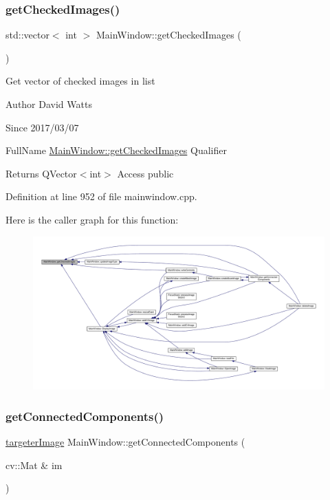 \subsubsection{\texorpdfstring{get\+Checked\+Images()}{getCheckedImages()}}
{\footnotesize\ttfamily std\+::vector$<$ int $>$ Main\+Window\+::get\+Checked\+Images (\begin{DoxyParamCaption}{ }\end{DoxyParamCaption})}

Get vector of checked images in list

\begin{DoxyAuthor}{Author}
David Watts 
\end{DoxyAuthor}
\begin{DoxySince}{Since}
2017/03/07
\end{DoxySince}
Full\+Name \hyperlink{class_main_window_a1e798fdae21c3294495ea7994df1887a}{Main\+Window\+::get\+Checked\+Images} Qualifier \begin{DoxyReturn}{Returns}
Q\+Vector$<$int$>$ Access public 
\end{DoxyReturn}


Definition at line 952 of file mainwindow.\+cpp.

Here is the caller graph for this function\+:
\nopagebreak
\begin{figure}[H]
\begin{center}
\leavevmode
\includegraphics[width=350pt]{class_main_window_a1e798fdae21c3294495ea7994df1887a_icgraph}
\end{center}
\end{figure}
\mbox{\label{class_main_window_a49cfabc6ef4845c5a9b5c9a92c9d4e2e}} 
\subsubsection{\texorpdfstring{get\+Connected\+Components()}{getConnectedComponents()}}
{\footnotesize\ttfamily \hyperlink{classtargeter_image}{targeter\+Image} Main\+Window\+::get\+Connected\+Components (\begin{DoxyParamCaption}\item[{cv\+::\+Mat \&}]{im }\end{DoxyParamCaption})}

